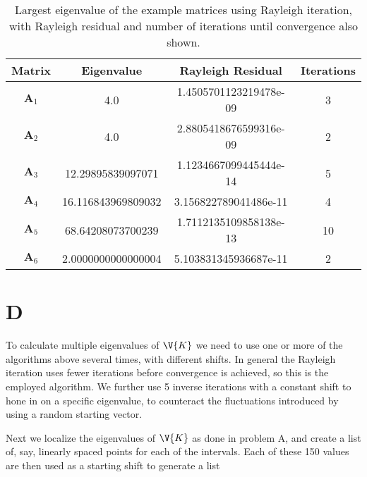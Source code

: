 \documentclass[a4paper,10pt]{article}
\begin{document}
	\begin{table}[H]
		\centering
		\begin{tabular}{c|c|c|c}
			Matrix & Eigenvalue & Rayleigh Residual & Iterations \\
			\hline
			$ \textbf{A}_1 $ & 4.0 &1.4505701123219478e-09 & 3\\
			$ \textbf{A}_2 $ & 4.0 &2.8805418676599316e-09 & 2\\
			$ \textbf{A}_3 $ & 12.29895839097071 & 1.1234667099445444e-14 & 5\\
			$ \textbf{A}_4 $ & 16.116843969809032 & 3.156822789041486e-11 & 4\\
			$ \textbf{A}_5 $ & 68.64208073700239 & 1.7112135109858138e-13 & 10\\
			$ \textbf{A}_6 $ & 2.0000000000000004 & 5.103831345936687e-11 & 2
		\end{tabular}
		\caption{Largest eigenvalue of the example matrices using Rayleigh iteration, with Rayleigh residual and number of iterations until convergence also shown.}
		\label{tab:rayleigh_iter}
	\end{table}
	
	
	\section*{D}
	To calculate multiple eigenvalues of $ \V{K} $ we need to use one or more of the algorithms above several times, with different shifts. In general the Rayleigh iteration uses fewer iterations before convergence is achieved, so this is the employed algorithm. We further use 5 inverse iterations with a constant shift to hone in on a specific eigenvalue, to counteract the fluctuations introduced by using a random starting vector.
	
	Next we localize the eigenvalues of $ \V{K} $ as done in problem A, and create a list of, say, linearly spaced points for each of the intervals. Each of these 150 values are then used as a starting shift to generate a list 
	
	
	
	
\end{document}
